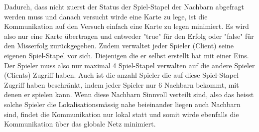 Dadurch, dass nicht zuerst der Status der Spiel-Stapel der Nachbarn abgefragt werden muss und danach versucht wirde eine Karte zu lege, ist die Kommunikation auf den Versuch einfach eine Karte zu legen minimiert. Es wird also nur eine Karte übertragen und entweder "true" für den Erfolg oder "false" für den Misserfolg zurückgegeben.
Zudem verwaltet jeder Spieler (Client) seine eigenen Spiel-Stapel vor sich. Diejenigen die er selbst erstellt hat mit einer Eins. Der Spieler muss also nur maximal 4 Spiel-Stapel verwalten auf die andere Spieler (Clients) Zugriff haben. 
Auch ist die anzahl Spieler die auf diese Spiel-Stapel Zugriff haben beschränkt, indem jeder Spieler nur 6 Nachbarn bekommt, mit denen er spielen kann. Wenn diese Nachbarn Sinnvoll verteilt sind, also das heisst solche Spieler die Lokalisationsmässig nahe beieinander liegen auch Nachbarn sind, findet die Kommunikation nur lokal statt und somit wirde ebenfalls die Kommunikation über das globale Netz minimiert.



